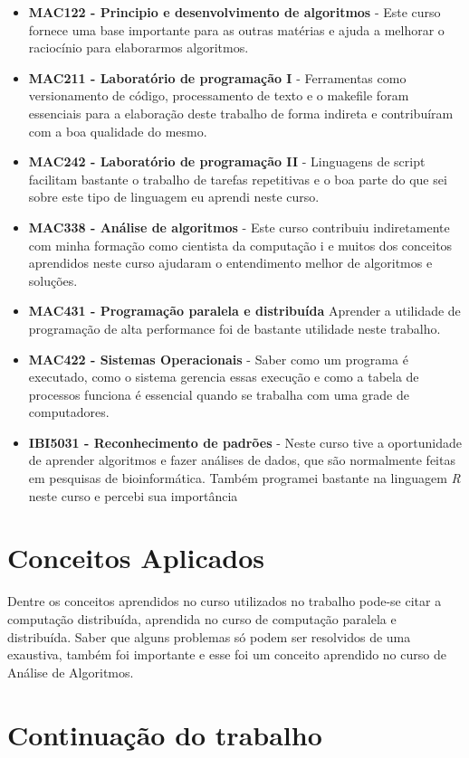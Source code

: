 \begin{itemize}
  \item \textbf{MAC122 - Principio e desenvolvimento de algoritmos } - Este curso fornece uma base importante para as outras matérias e
ajuda a melhorar o raciocínio para elaborarmos algoritmos.
  \item \textbf{MAC211 - Laboratório de programação I} - Ferramentas como versionamento de código, processamento de 
texto e o makefile foram essenciais para a elaboração deste trabalho de forma indireta e contribuíram com a 
boa qualidade do mesmo.
  \item \textbf{MAC242 - Laboratório de programação II} - Linguagens de script facilitam bastante o trabalho de tarefas 
repetitivas e o boa parte do que sei sobre este tipo de linguagem eu aprendi neste curso.
  \item \textbf{MAC338 - Análise de algoritmos} - Este curso contribuiu indiretamente com minha formação como cientista da computação i
e muitos dos conceitos aprendidos neste curso ajudaram o entendimento melhor de algoritmos e soluções.
  \item \textbf{MAC431 - Programação paralela e distribuída} Aprender a utilidade de programação de alta performance foi de bastante utilidade
neste trabalho.
  \item \textbf{MAC422 - Sistemas Operacionais} - Saber como um programa é executado, como o sistema gerencia essas execução e como a tabela de processos
funciona é essencial quando se trabalha com uma grade de computadores. 
  \item \textbf{IBI5031 - Reconhecimento de padrões} - Neste curso tive a oportunidade de aprender algoritmos e fazer análises de dados, 
que são normalmente feitas em pesquisas de bioinformática. Também programei bastante na linguagem \emph{R} neste curso e percebi sua
importância
\end{itemize}

\section{Conceitos Aplicados}

Dentre os conceitos aprendidos no curso utilizados no trabalho pode-se citar a computação distribuída, aprendida no curso de
computação paralela e distribuída. Saber que alguns problemas só podem ser resolvidos de uma exaustiva, também 
foi importante e esse foi um conceito aprendido no curso de Análise de Algoritmos. 


\section{Continuação do trabalho}

